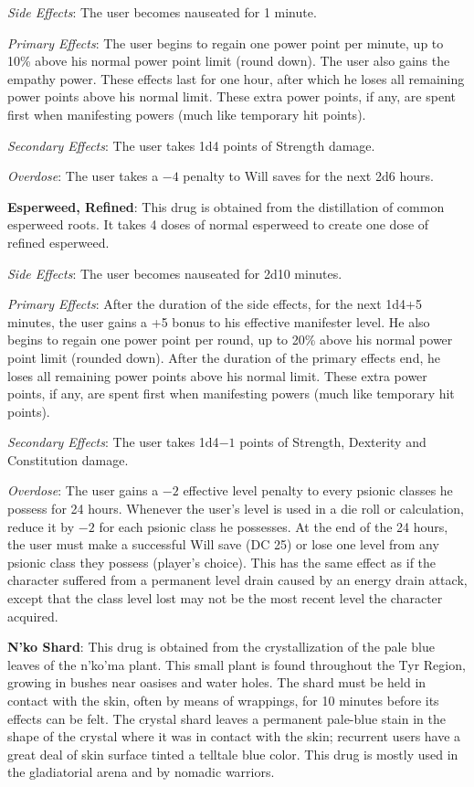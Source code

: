 \textit{Side Effects}: The user becomes nauseated for 1 minute.

\textit{Primary Effects}: The user begins to regain one power point per minute, up to 10\% above his normal power point limit (round down). The user also gains the empathy power. These effects last for one hour, after which he loses all remaining power points above his normal limit. These extra power points, if any, are spent first when manifesting powers (much like temporary hit points).

\textit{Secondary Effects}: The user takes 1d4 points of Strength damage.

\textit{Overdose}: The user takes a $-4$ penalty to Will saves for the next 2d6 hours.

\textbf{Esperweed, Refined}: This drug is obtained from the distillation of common esperweed roots. It takes 4 doses of normal esperweed to create one dose of refined esperweed.

\textit{Side Effects}: The user becomes nauseated for 2d10 minutes.

\textit{Primary Effects}: After the duration of the side effects, for the next 1d4+5 minutes, the user gains a +5 bonus to his effective manifester level. He also begins to regain one power point per round, up to 20\% above his normal power point limit (rounded down). After the duration of the primary effects end, he loses all remaining power points above his normal limit. These extra power points, if any, are spent first when manifesting powers (much like temporary hit points).

\textit{Secondary Effects}: The user takes 1d4$-1$ points of Strength, Dexterity and Constitution damage.

\textit{Overdose}: The user gains a $-2$ effective level penalty to every psionic classes he possess for 24 hours. Whenever the user's level is used in a die roll or calculation, reduce it by $-2$ for each psionic class he possesses. At the end of the 24 hours, the user must make a successful Will save (DC 25) or lose one level from any psionic class they possess (player's choice). This has the same effect as if the character suffered from a permanent level drain caused by an energy drain attack, except that the class level lost may not be the most recent level the character acquired.

\textbf{N'ko Shard}: This drug is obtained from the crystallization of the pale blue leaves of the n'ko'ma plant. This small plant is found throughout the Tyr Region, growing in bushes near oasises and water holes. The shard must be held in contact with the skin, often by means of wrappings, for 10 minutes before its effects can be felt. The crystal shard leaves a permanent pale-blue stain in the shape of the crystal where it was in contact with the skin; recurrent users have a great deal of skin surface tinted a telltale blue color. This drug is mostly used in the gladiatorial arena and by nomadic warriors.

